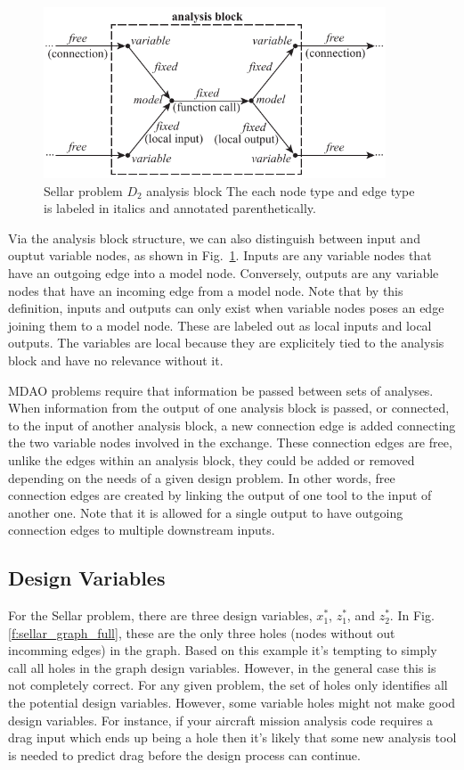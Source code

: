 \begin{figure}[htb!]
    \begin{center}
    \includegraphics[width=4in]{images/analysis_block}
    \end{center}
    \vspace{-10pt}
\caption{Sellar problem $D_2$ analysis block The each node type and edge type is labeled in italics and annotated parenthetically.}
\label{f:analysis block}
\end{figure}

Via the analysis block structure, we can also distinguish between input and ouptut
variable nodes, as shown in Fig.~\ref{f:analysis block}. Inputs are any variable nodes that have an outgoing edge into a model 
node. Conversely, outputs are any variable nodes that have an incoming edge from a model node. 
Note that by this definition, inputs and outputs can only exist when variable nodes poses an 
edge joining them to a model node. These are labeled out as 
local inputs and local outputs. The variables are local because they are explicitely tied
to the analysis block and have no relevance without it. 

MDAO problems require that information be passed between sets of analyses. When 
information from the output of one analysis block is passed, or connected, to the 
input of another analysis block, a new connection edge is added connecting the two 
variable nodes involved in the exchange. These connection edges are free, unlike the edges 
within an analysis block, they could be added or removed depending on the needs
of a given design problem. In other words, free connection edges are created by 
linking the output of one tool to the input of another one. Note that 
it is allowed for a single output to have outgoing connection edges to multiple 
downstream inputs. 

\subsection{Design Variables}
For the Sellar problem, there are three design variables, $x_1^*$, $z_1^*$, and $z_2^*$. In Fig. 
\ref{f:sellar_graph_full}, these are the only three holes (nodes without out 
incomming edges) in the graph. Based on this example it's tempting to simply 
call all holes in the graph design variables. However, in the general case this is 
not completely correct. For any given problem, the set of holes only identifies 
all the potential design variables. However, some variable holes might not make good design 
variables. For instance, if your aircraft mission analysis code requires a drag input 
which ends up being a hole then it's likely that some new analysis tool is needed
to predict drag before the design process can continue. 

